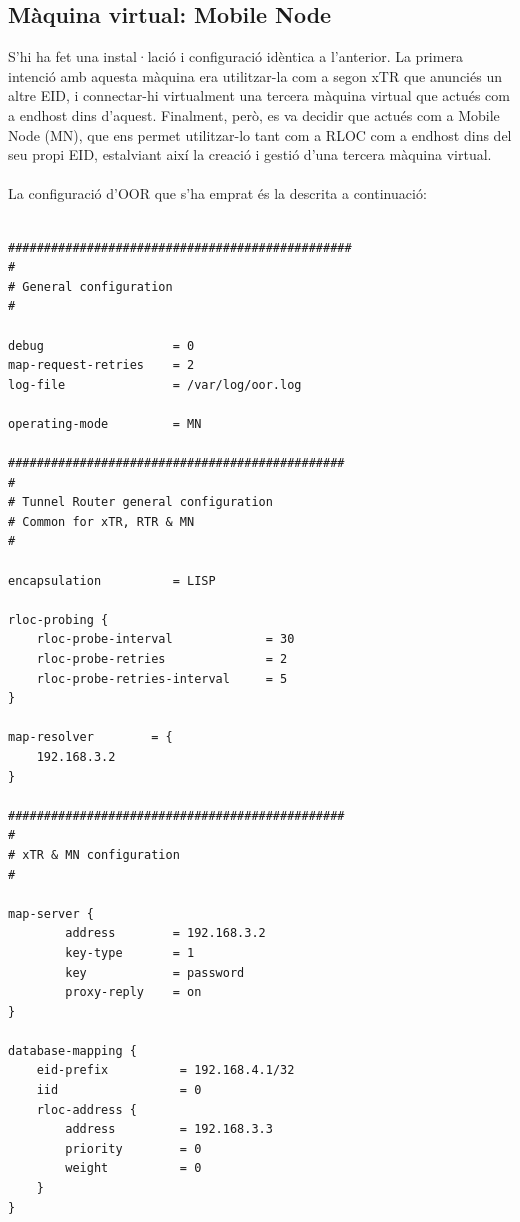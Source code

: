 \documentclass[11pt]{article}
\begin{document}
\subsection{Màquina virtual: Mobile Node}
S’hi ha fet una instal·lació i configuració idèntica a l’anterior. La primera intenció amb aquesta màquina era utilitzar-la com a segon xTR que anunciés un altre EID, i connectar-hi virtualment una tercera màquina virtual que actués com a endhost dins d’aquest. Finalment, però, es va decidir que actués com a Mobile Node (MN), que ens permet utilitzar-lo tant com a RLOC com a endhost dins del seu propi EID, estalviant així la creació i gestió d’una tercera màquina virtual.\\
\\
La configuració d’OOR que s’ha emprat és la descrita a continuació:\\
\lstset{language=C}
\begin{lstlisting}[frame=single]

################################################
#
# General configuration
#

debug                  = 0 
map-request-retries    = 2
log-file               = /var/log/oor.log
 
operating-mode         = MN

###############################################
#
# Tunnel Router general configuration
# Common for xTR, RTR & MN
#

encapsulation          = LISP

rloc-probing {
    rloc-probe-interval             = 30
    rloc-probe-retries              = 2
    rloc-probe-retries-interval     = 5
}

map-resolver        = {
	192.168.3.2
}

###############################################
#
# xTR & MN configuration
#

map-server {
        address        = 192.168.3.2
        key-type       = 1
        key            = password
        proxy-reply    = on
}

database-mapping {
    eid-prefix          = 192.168.4.1/32
    iid                 = 0
    rloc-address {
        address         = 192.168.3.3
        priority        = 0
        weight          = 0
    }
}

\end{lstlisting}
\end{document}
